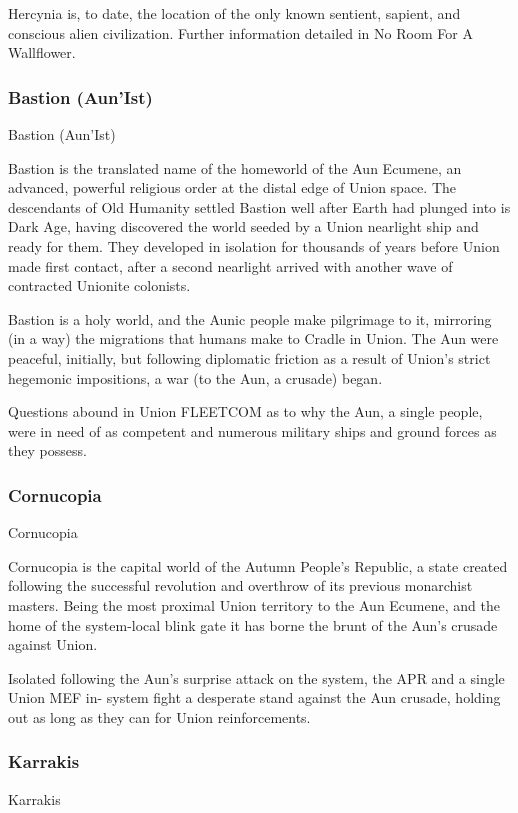 Hercynia is, to date, the location of the only known sentient, sapient, and conscious alien
civilization. Further information detailed in No Room For A Wallflower.

\subsubsection{Bastion (Aun’Ist)}
Bastion (Aun’Ist)

Bastion is the translated name of the homeworld of the Aun Ecumene, an advanced, powerful
religious order at the distal edge of Union space. The descendants of Old Humanity settled
Bastion well after Earth had plunged into is Dark Age, having discovered the world seeded by a
Union nearlight ship and ready for them. They developed in isolation for thousands of years
before Union made first contact, after a second nearlight arrived with another wave of contracted
Unionite colonists.


Bastion is a holy world, and the Aunic people make pilgrimage to it, mirroring (in a way) the
migrations that humans make to Cradle in Union. The Aun were peaceful, initially, but following
diplomatic friction as a result of Union’s strict hegemonic impositions, a war (to the Aun, a
crusade) began.


Questions abound in Union FLEETCOM as to why the Aun, a single people, were in need of as
competent and numerous military ships and ground forces as they possess.

\subsubsection{Cornucopia}
Cornucopia

Cornucopia is the capital world of the Autumn People’s Republic, a state created following the
successful revolution and overthrow of its previous monarchist masters. Being the most proximal
Union territory to the Aun Ecumene, and the home of the system-local blink gate it has borne the
brunt of the Aun’s crusade against Union.


Isolated following the Aun’s surprise attack on the system, the APR and a single Union MEF in-
system fight a desperate stand against the Aun crusade, holding out as long as they can for
Union reinforcements.

\subsubsection{Karrakis}
Karrakis

